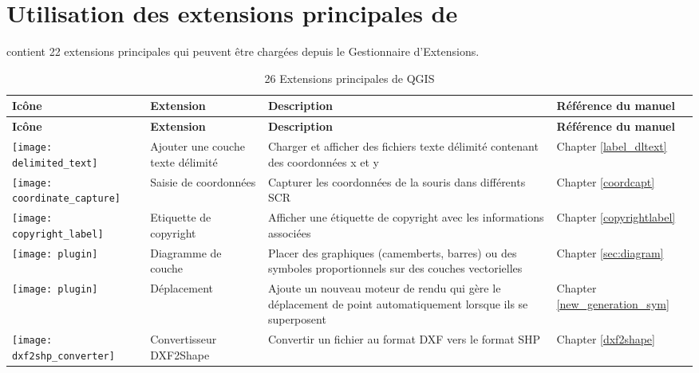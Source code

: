 
\chapter{Utilisation des extensions principales de \qg}\label{sec:core_plugins}

\qg \CURRENT contient 22 extensions principales qui peuvent être chargées depuis le Gestionnaire d'Extensions.

{\setlength{\extrarowheight}{15pt}
\small
\begin{longtable}{|p{1cm}|p{4cm}|p{8cm}|p{3cm}|}
\caption{26 Extensions principales de QGIS}\label{tab:core_plugins} \\
\hline
  \textbf{Icône} & \textbf{Extension} & \textbf{Description} & \textbf{Référence du manuel}\\
\endfirsthead
\hline 
  \textbf{Icône} & \textbf{Extension} & \textbf{Description} & \textbf{Référence du manuel}\\
\endhead
\hline 
\texttt{[image: delimited\_text]}
 & Ajouter une couche texte délimité \index{extensions!texte delimite} & Charger et afficher des fichiers texte délimité contenant des coordonnées x et y & Chapter \ref{label_dltext}\\
\hline
\texttt{[image: coordinate\_capture]}
 & Saisie de coordonnées \index{extensions!saisie de coordonnees} & Capturer les coordonnées de la souris dans différents SCR & Chapter \ref{coordcapt}\\
\hline 
\texttt{[image: copyright\_label]}
 & Etiquette de copyright \index{extensions!copyright} & Afficher une étiquette de copyright avec les informations associées & Chapter \ref{copyrightlabel}\\
\hline
\texttt{[image: plugin]}
 & Diagramme de couche \index{extensions!diagram} & Placer des graphiques (camemberts, barres) ou des symboles proportionnels sur des couches vectorielles & Chapter \ref{sec:diagram}\\
\hline
\texttt{[image: plugin]}
 & Déplacement \index{plugins!point displacement}& Ajoute un nouveau moteur de rendu qui gère le déplacement de point automatiquement lorsque ils se superposent & Chapter \ref{new_generation_sym}\\
\hline
\texttt{[image: dxf2shp\_converter]}
 & Convertisseur DXF2Shape \index{extensions!DXF2Shape} & Convertir un fichier au format DXF vers le format SHP & Chapter \ref{dxf2shape}\\

\end{longtable}}
